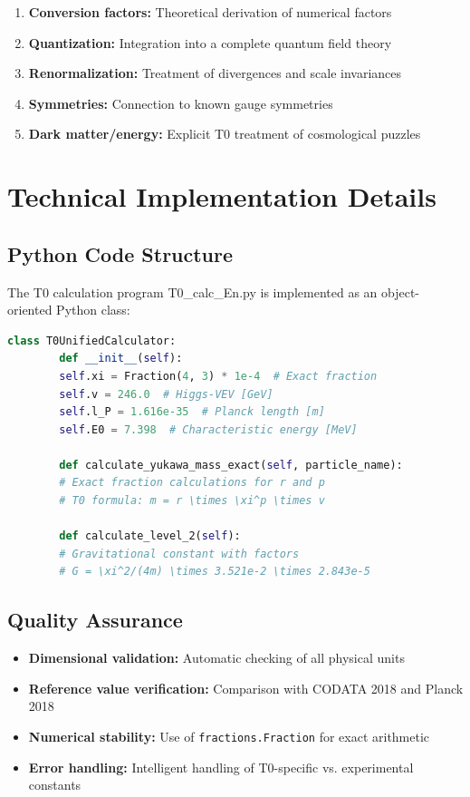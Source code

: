 \documentclass[12pt,a4paper]{report}
\begin{document}
	\begin{enumerate}
		\item \textbf{Conversion factors:} Theoretical derivation of numerical factors
		\item \textbf{Quantization:} Integration into a complete quantum field theory
		\item \textbf{Renormalization:} Treatment of divergences and scale invariances
		\item \textbf{Symmetries:} Connection to known gauge symmetries
		\item \textbf{Dark matter/energy:} Explicit T0 treatment of cosmological puzzles
	\end{enumerate}
	
	\section{Technical Implementation Details}
	
	\subsection{Python Code Structure}
	
	The T0 calculation program T0\_calc\_En.py is implemented as an object-oriented Python class:
	
	\begin{lstlisting}[language=Python, basicstyle=\small\ttfamily]
		class T0UnifiedCalculator:
		def __init__(self):
		self.xi = Fraction(4, 3) * 1e-4  # Exact fraction
		self.v = 246.0  # Higgs-VEV [GeV]
		self.l_P = 1.616e-35  # Planck length [m]
		self.E0 = 7.398  # Characteristic energy [MeV]
		
		def calculate_yukawa_mass_exact(self, particle_name):
		# Exact fraction calculations for r and p
		# T0 formula: m = r \times \xi^p \times v
		
		def calculate_level_2(self):
		# Gravitational constant with factors
		# G = \xi^2/(4m) \times 3.521e-2 \times 2.843e-5
	\end{lstlisting}
	
	\subsection{Quality Assurance}
	
	\begin{itemize}
		\item \textbf{Dimensional validation:} Automatic checking of all physical units
		\item \textbf{Reference value verification:} Comparison with CODATA 2018 and Planck 2018
		\item \textbf{Numerical stability:} Use of \texttt{fractions.Fraction} for exact arithmetic
		\item \textbf{Error handling:} Intelligent handling of T0-specific vs. experimental constants
	\end{itemize}
	
\end{document}
